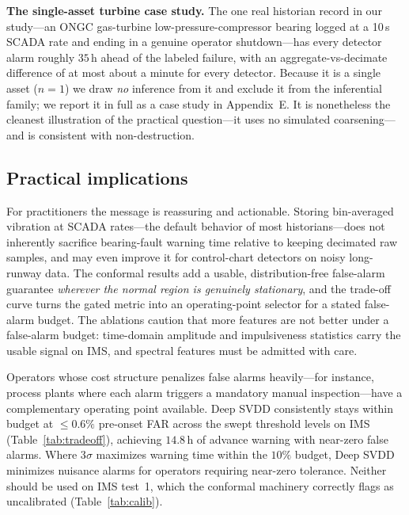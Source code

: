\documentclass[journal]{IEEEtran}
\begin{document}
\textbf{The single-asset turbine case study.} The one real historian record in
our study---an ONGC gas-turbine low-pressure-compressor bearing logged at a
10\,s SCADA rate and ending in a genuine operator shutdown---has every detector
alarm roughly $35$\,h ahead of the labeled failure, with an aggregate-vs-decimate
difference of at most about a minute for every detector. Because it is a single
asset ($n{=}1$) we draw \emph{no} inference from it and exclude it from the
inferential family; we report it in full as a case study in Appendix~E. It is
nonetheless the cleanest illustration of the practical question---it uses no
simulated coarsening---and is consistent with non-destruction.

\subsection{Practical implications}
For practitioners the message is reassuring and actionable. Storing
bin-averaged vibration at SCADA rates---the default behavior of most
historians---does not inherently sacrifice bearing-fault warning time relative
to keeping decimated raw samples, and may even improve it for control-chart
detectors on noisy long-runway data. The conformal results add a usable, distribution-free false-alarm
guarantee \emph{wherever the normal region is genuinely stationary}, and the
trade-off curve turns the gated metric into an operating-point selector for a
stated false-alarm budget. The ablations caution that more features are not
better under a false-alarm budget: time-domain amplitude and impulsiveness
statistics carry the usable signal on IMS, and spectral features must be
admitted with care.

Operators whose cost structure penalizes false alarms heavily---for instance,
process plants where each alarm triggers a mandatory manual inspection---have a
complementary operating point available. Deep SVDD consistently stays within budget
at $\le0.6\%$ pre-onset FAR across the swept threshold levels on IMS
(Table~\ref{tab:tradeoff}), achieving $14.8$\,h of advance warning with near-zero
false alarms. Where 3$\sigma$ maximizes warning time within the $10\%$ budget, Deep
SVDD minimizes nuisance alarms for operators requiring near-zero tolerance. Neither
should be used on IMS test~1, which the conformal machinery correctly flags as
uncalibrated (Table~\ref{tab:calib}).
\end{document}
